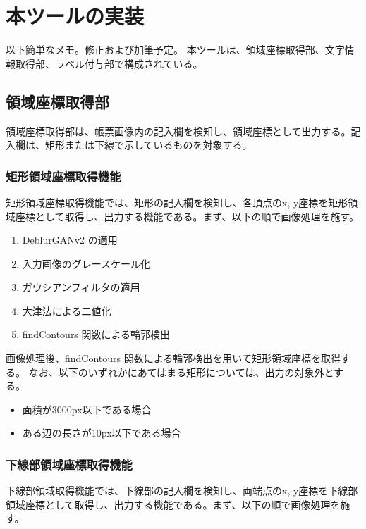 \chapter{本ツールの実装}\label{cha:Implementation}
以下簡単なメモ。修正および加筆予定。
本ツールは、領域座標取得部、文字情報取得部、ラベル付与部で構成されている。


\section{領域座標取得部}\label{sec:area_coords_obtainment_part}
領域座標取得部は、帳票画像内の記入欄を検知し、領域座標として出力する。記入欄は、矩形または下線で示しているものを対象する。


\subsection{矩形領域座標取得機能}\label{subsec:rect_coords_obtainment_feature}
矩形領域座標取得機能では、矩形の記入欄を検知し、各頂点のx, y座標を矩形領域座標として取得し、出力する機能である。まず、以下の順で画像処理を施す。

\begin{enumerate}[label=(\arabic*)]
    \item DeblurGANv2 の適用
    \item 入力画像のグレースケール化
    \item ガウシアンフィルタの適用
    \item 大津法による二値化
    \item findContours 関数による輪郭検出
\end{enumerate}

画像処理後、findContours 関数による輪郭検出を用いて矩形領域座標を取得する。
なお、以下のいずれかにあてはまる矩形については、出力の対象外とする。

\begin{itemize}
    \item 面積が3000px以下である場合
    \item ある辺の長さが10px以下である場合
\end{itemize}


\subsection{下線部領域座標取得機能}\label{subsec:underline_coords_obtainment_feature}
下線部領域取得機能では、下線部の記入欄を検知し、両端点のx, y座標を下線部領域座標として取得し、出力する機能である。まず、以下の順で画像処理を施す。


